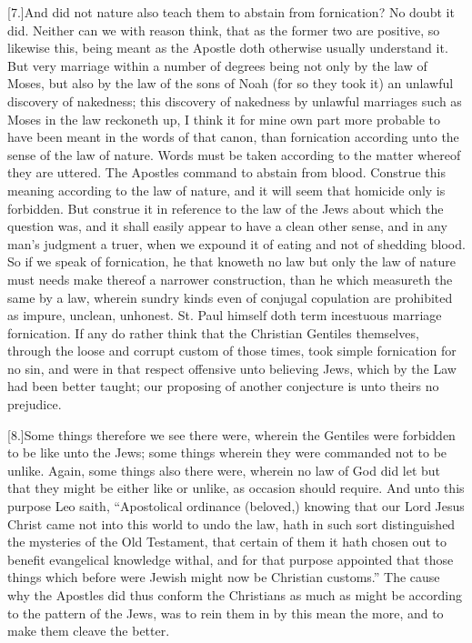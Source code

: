 [7.]And did not nature also teach them to abstain from fornication? No doubt it did. Neither can we with reason think, that as the former two are positive, so likewise this, being meant as the Apostle doth otherwise usually understand it. But very marriage within a number of degrees being not only by the law of Moses, but also by the law of the sons of Noah (for so they took it) an unlawful discovery of nakedness; this discovery of nakedness by unlawful marriages such as Moses in the law reckoneth up, I think it for mine own part more probable to have been meant in the words of that canon, than fornication according unto the sense of the law of nature. Words must be taken according to the matter whereof they are uttered. The Apostles command to abstain from blood. Construe this meaning according to the law of nature, and it will seem that homicide only is forbidden. But construe it in reference to the law of the Jews about which the question was, and it shall easily appear to have a clean other sense, and in any man’s judgment a truer, when we expound it of eating and not of shedding blood. So if we speak of fornication, he that knoweth no law but only the law of nature must needs make thereof a narrower construction, than he which measureth the same by a law, wherein sundry kinds  even of conjugal copulation are prohibited as impure, unclean, unhonest. St. Paul himself doth term incestuous marriage fornication. If any do rather think that the Christian Gentiles themselves, through the loose and corrupt custom of those times, took simple fornication for no sin, and were in that respect offensive unto believing Jews, which by the Law had been better taught; our proposing of another conjecture is unto theirs no prejudice.

[8.]Some things therefore we see there were, wherein the Gentiles were forbidden to be like unto the Jews; some things wherein they were commanded not to be unlike. Again, some things also there were, wherein no law of God did let but that they might be either like or unlike, as occasion should require. And unto this purpose Leo saith, “Apostolical ordinance (beloved,) knowing that our Lord Jesus Christ came not into this world to undo the law, hath in such sort distinguished the mysteries of the Old Testament, that certain of them it hath chosen out to benefit evangelical knowledge withal, and for that purpose appointed that those things which before were Jewish might now be Christian customs.” The cause why the Apostles did thus conform the Christians as much as might be according to the pattern of the Jews, was to rein them in by this mean the more, and to make them cleave the better.

